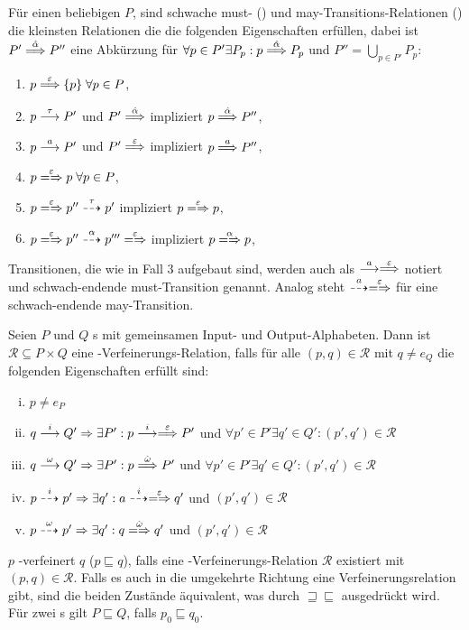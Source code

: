 \begin{Def}
  Für einen beliebigen \MIA{} $P$, sind schwache must- (\weakmust) und
  may-Transitions-Relationen (\weakmay) die kleinsten Relationen die die
  folgenden Eigenschaften erfüllen, dabei ist $P'\weakmust[\hat{\alpha}]P''$
  eine Abkürzung für $\forall p\in P'\exists P_p:p\weakmust[\hat{\alpha}]P_p$
  und $P''=\underset{p\in P'}{\bigcup}P_p$:
  \begin{enumerate}
    \item $p\weakmust[\varepsilon]\{p\}\; \forall p\in P$,
    \item $p\must[\tau]P'$ und $P'\weakmust[\hat{\alpha}]$ impliziert
      $p\weakmust[\hat{\alpha}]P''$,
    \item $p\must[a]P'$ und $P'\weakmust[\varepsilon]$ impliziert
      $p\weakmust[a]P''$,
    \item $p\weakmay[\varepsilon]p\; \forall p\in P$,
    \item $p\weakmay[\varepsilon]p''\may[\tau]p'$ impliziert
      $p\weakmay[\varepsilon]p$,
    \item $p\weakmay[\varepsilon]p''\may[\alpha]p'''\weakmay[\varepsilon]$
      impliziert $p\weakmay[\alpha]p$,
  \end{enumerate}

  Transitionen, die wie in Fall 3 aufgebaut sind, werden auch als
  $\must[a]\weakmust[\varepsilon]$ notiert und schwach-endende must-Transition
   genannt. Analog steht
  $\may[a]\weakmay[\varepsilon]$ für eine schwach-endende may-Transition.
\end{Def}

\begin{Def}
  Seien $P$ und $Q$ \MIA{}s mit gemeinsamen Input- und Output-Alphabeten. Dann
  ist $\mathcal{R}\subseteq P\times Q$ eine \MIA{}-Verfeinerungs-Relation,
  falls für alle $(p,q)\in\mathcal{R}$ mit $q\neq e_Q$ die folgenden
  Eigenschaften erfüllt sind:
  \begin{enumerate}[(i)]
    \item $p\neq e_P$
    \item $q\must[i]Q'\Rightarrow\exists P': p\must[i]\weakmust[\varepsilon]
      P'$ und $\forall p'\in P'\exists q'\in Q':(p',q')\in\mathcal{R}$
    \item $q\must[\omega]Q'\Rightarrow\exists P': p\weakmust[\hat{\omega}]
      P'$ und $\forall p'\in P'\exists q'\in Q':(p',q')\in\mathcal{R}$
    \item $p\may[i]p'\Rightarrow\exists q': a\may[i]\weakmay[\varepsilon]
      q'$ und $(p',q')\in\mathcal{R}$
    \item $p\may[\omega]p'\Rightarrow\exists q': q\weakmay[\hat{\omega}]
      q'$ und $(p',q')\in\mathcal{R}$
  \end{enumerate}
  $p$ \MIA{}-verfeinert $q$ ($p\sqsubseteq q$), falls eine
  \MIA{}-Verfeinerungs-Relation $\mathcal{R}$ existiert mit
  $(p,q)\in\mathcal{R}$. Falls es auch in die umgekehrte Richtung eine
  Verfeinerungsrelation gibt, sind die beiden Zustände äquivalent, was durch
  $\sqsupseteq\sqsubseteq$ ausgedrückt wird. Für zwei \MIA{}s gilt $P\sqsubseteq Q$, falls
  $p_0\sqsubseteq q_0$.
\end{Def}
